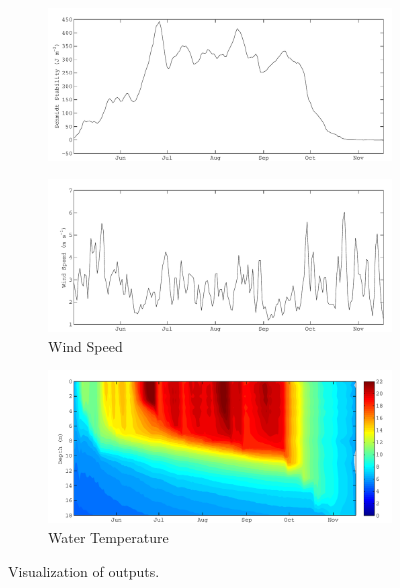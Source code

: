 \begin{figure}
\begin{subfigure}{\lafigsize}
			\includegraphics[width=\textwidth]{figures/Sparkling_St.pdf}
		\end{subfigure}
		\begin{subfigure}{\lafigsize}
			\caption{\label{fig:la:out:wndSpd}Wind Speed}
			\includegraphics[width=\textwidth]{figures/Sparkling_wndSpd.pdf}
		\end{subfigure}
		\begin{subfigure}{\lafigsize}
			\caption{\label{fig:la:out:wTemp}Water Temperature}
			\includegraphics[width=\textwidth]{figures/Sparkling_wTemp.pdf}
		\end{subfigure}
		\caption{\label{fig:la:outputs:2}Visualization of \la outputs.}
	\end{figure}

